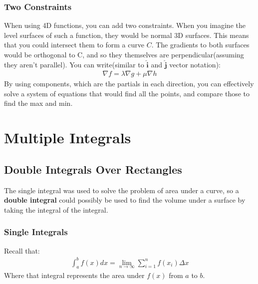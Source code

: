 \documentclass{article}
\let\oldhat\hat
\renewcommand{\hat}[1]{\oldhat{\mathbf{#1}}}
\newcommand{\n}{\nabla}
\begin{document}
\subsubsection{Two Constraints}
When using 4D functions, you can add two constraints. When you imagine the level surfaces of such a function, they would be normal 3D surfaces. This means that you could intersect them to form a curve $C$. The gradients to both surfaces would be orthogonal to C, and so they themselves are perpendicular(assuming they aren't parallel). You can write(similar to $\hat{i}$ and $\hat{j}$ vector notation):
\begin{gather*}
    \n f = \lambda \n g + \mu \n h
\end{gather*}
By using components, which are the partials in each direction, you can effectively solve a system of equations that would find all the points, and compare those to find the max and min.
\section{Multiple Integrals}
\subsection{Double Integrals Over Rectangles}
The single integral was used to solve the problem of area under a curve, so a \textbf{double integral} could possibly be used to find the volume under a surface by taking the integral of the integral.
\subsubsection{Single Integrals}
Recall that:
\begin{gather*}
    \int_a^b f(x) dx = \lim_{n \to \infty} \sum_{i = 1}^n  f(x_i) \Delta x
\end{gather*}
Where that integral represents the area under $f(x)$ from $a$ to $b$.
\end{document}
